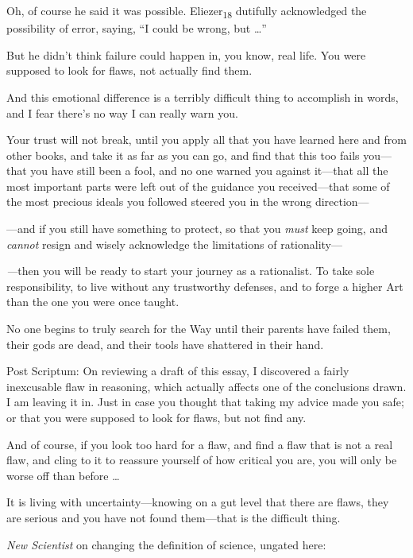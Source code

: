 {
 Oh, of course he said it was possible. Eliezer\textsubscript{18}
dutifully acknowledged the possibility of error, saying,
``I could be wrong, but \ldots''}

{
 But he didn't think failure could happen in, you
know, real life. You were supposed to look for flaws, not actually find
them.}

{
 And this emotional difference is a terribly difficult thing to
accomplish in words, and I fear there's no way I can
really warn you.}

{
 Your trust will not break, until you apply all that you have
learned here and from other books, and take it as far as you can go,
and find that this too fails you---that you have still been a fool, and
no one warned you against it---that all the most important parts were
left out of the guidance you received---that some of the most precious
ideals you followed steered you in the wrong direction---}

{
 {}---and if you still have something to protect, so that you
\textit{must} keep going, and \textit{cannot} resign and wisely
acknowledge the limitations of rationality---}

{
 \textit{{}---}then you will be ready to start your journey as a
rationalist. To take sole responsibility, to live without any
trustworthy defenses, and to forge a higher Art than the one you were
once taught.}

{
 No one begins to truly search for the Way until their parents have
failed them, their gods are dead, and their tools have shattered in
their hand.}

{
 Post Scriptum: On reviewing a draft of this essay, I discovered a
fairly inexcusable flaw in reasoning, which actually affects one of the
conclusions drawn. I am leaving it in. Just in case you thought that
taking my advice made you safe; or that you were supposed to look for
flaws, but not find any.}

{
 And of course, if you look too hard for a flaw, and find a flaw
that is not a real flaw, and cling to it to reassure yourself of how
critical you are, you will only be worse off than before \ldots}

{
 It is living with uncertainty---knowing on a gut level that there
are flaws, they are serious and you have not found them---that is the
difficult thing.}

\myendsectiontext


{
 \textit{New Scientist} on changing the definition of science,
ungated here:}

